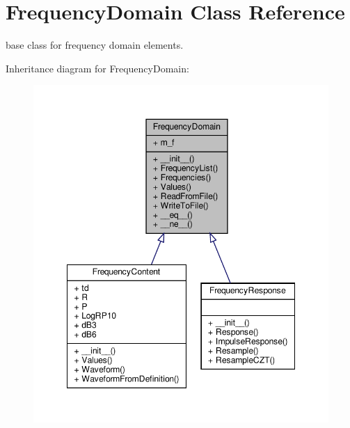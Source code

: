 \hypertarget{classSignalIntegrity_1_1FrequencyDomain_1_1FrequencyDomain_1_1FrequencyDomain}{}\section{Frequency\+Domain Class Reference}
\label{classSignalIntegrity_1_1FrequencyDomain_1_1FrequencyDomain_1_1FrequencyDomain}


base class for frequency domain elements.  




Inheritance diagram for Frequency\+Domain\+:
\nopagebreak
\begin{figure}[H]
\begin{center}
\leavevmode
\includegraphics[width=348pt]{classSignalIntegrity_1_1FrequencyDomain_1_1FrequencyDomain_1_1FrequencyDomain__inherit__graph}
\end{center}
\end{figure}


